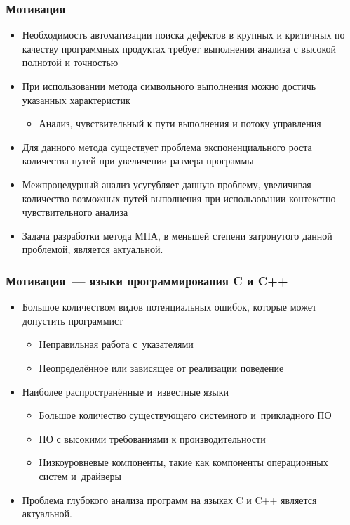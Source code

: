 \documentclass[hyperref={pdfpagelabels=false}]{beamer}
\begin{document}
\begin{frame}[allowframebreaks]
\frametitle{Мотивация}
\begin{itemize}
  \item Необходимость автоматизации поиска дефектов в крупных и критичных по качеству программных продуктах требует выполнения анализа с высокой полнотой и точностью
  \item При использовании метода символьного выполнения можно достичь указанных характеристик
  \begin{itemize}
    \item Анализ, чувствительный к пути выполнения и потоку управления
  \end{itemize}

  \item Для данного метода существует проблема экспоненциального роста количества путей при увеличении размера программы
  \item Межпроцедурный анализ усугубляет данную проблему, увеличивая количество возможных путей выполнения при использовании контекстно-чувствительного анализа
  \item Задача разработки метода МПА, в меньшей степени затронутого данной проблемой, является актуальной.
\end{itemize}
\end{frame}

\begin{frame}[allowframebreaks]
\frametitle{Мотивация~--- языки программирования C и C++}
\begin{itemize}
  \item Большое количеством видов потенциальных ошибок, которые может допустить программист
  \begin{itemize}
    \item Неправильная работа с~указателями
    \item Неопределённое или зависящее от реализации поведение
  \end{itemize}
  \item Наиболее распространённые и~известные языки
    \begin{itemize}
    \item Большое количество существующего системного и~прикладного ПО
    \item ПО с высокими требованиями к производительности
    \item Низкоуровневые компоненты, такие как компоненты операционных систем и~драйверы
  \end{itemize}
  \item Проблема глубокого анализа программ на языках C и C++ является актуальной.
\end{itemize}
\end{frame}
\end{document}
